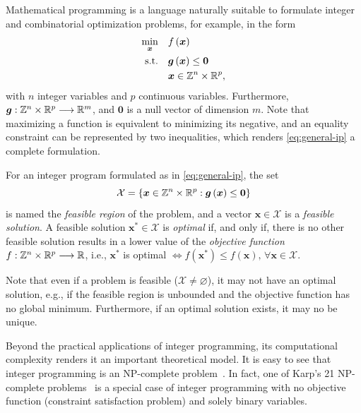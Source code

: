 Mathematical programming is a language naturally suitable to formulate integer and combinatorial optimization problems, for example, in the form
\begin{equation}\label{eq:general-ip}
    \begin{split}
	\min_{\bm{x}} \quad & f\left( \bm{x} \right) \\
	\textrm{s.t.} \quad & \bm{g}\left( \bm{x} \right) \le \bm{0} \\
	  & \bm{x} \in \mathbb{Z}^{n}\times \mathbb{R}^{p}
    ,\end{split}
\end{equation}
with $n$ integer variables and $p$ continuous variables.
Furthermore, $\bm{g}: \mathbb{Z}^{n}\times \mathbb{R}^{p} \longrightarrow \mathbb{R}^{m}$,  and $\bm{0}$ is a null vector of dimension $m$.
Note that maximizing a function is equivalent to minimizing its negative, and an equality constraint can be represented by two inequalities, which renders \eqref{eq:general-ip} a complete formulation.

For an integer program formulated as in \eqref{eq:general-ip}, the set \[
\mathcal{X}=\left\{ \bm{x}\in \mathbb{Z}^{n}\times \mathbb{R}^{p}: \bm{g}\left( \bm{x} \right) \le \bm{0}\right\} 
\] is named the \emph{feasible region} of the problem, and a vector $\bm{x}\in \mathcal{X}$ is a \emph{feasible solution}.
A feasible solution $\bm{x}^{*}\in \mathcal{X}$ is \emph{optimal} if, and only if, there is no other feasible solution results in a lower value of the \emph{objective function} $f: \mathbb{Z}^{n}\times \mathbb{R}^{p} \longrightarrow \mathbb{R}$, i.e., $\bm{x}^{*}$ is optimal $\iff f(\bm{x}^{*}) \le f(\bm{x}) ,\,\forall \bm{x}\in \mathcal{X}$.

Note that even if a problem is feasible ($\mathcal{X}\neq \varnothing$), it may not have an optimal solution, e.g., if the feasible region is unbounded and the objective function has no global minimum.
Furthermore, if an optimal solution exists, it may no be unique.

Beyond the practical applications of integer programming, its computational complexity renders it an important theoretical model.
It is easy to see that integer programming is an NP-complete problem~\cite{nemhauserIntegerCombinatorialOptimization1999}.
In fact, one of Karp's 21 NP-complete problems~\cite{karpReducibilityCombinatorialProblems1972} is a special case of integer programming with no objective function (constraint satisfaction problem) and solely binary variables.

